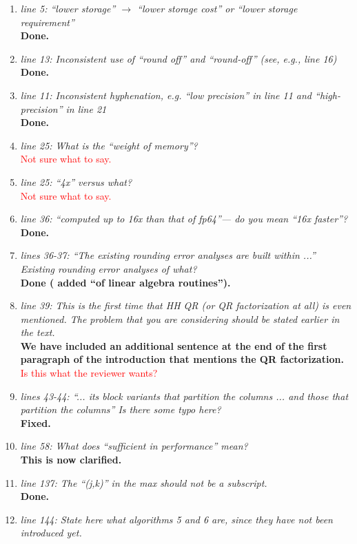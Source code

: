 \documentclass[final,onefignum,onetabnum]{siamart190516}
\newcommand{\red}[1]{\textcolor{red}{#1}}
\begin{document}
\begin{enumerate}
    \item {\it line 5: ``lower storage'' $\rightarrow$ ``lower storage cost'' or ``lower storage requirement'' }\\
    {\bf Done.}
    \item {\it line 13: Inconsistent use of ``round off'' and ``round-off'' (see, e.g., line 16) }\\
    {\bf Done.}
    \item {\it line 11: Inconsistent hyphenation, e.g. ``low precision'' in line 11 and ``high-precision'' in line 21 }\\
    {\bf Done.}
    \item {\it line 25: What is the ``weight of memory''? }\\
    \red{Not sure what to say.}
    \item {\it line 25: ``4x'' versus what? }\\
    \red{Not sure what to say.}
    \item {\it line 36: ``computed up to 16x than that of fp64''--- do you mean ``16x faster''? }\\
    {\bf Done.}
    \item {\it lines 36-37: ``The existing rounding error analyses are built within ...'' Existing rounding error analyses of what? }\\
    {\bf Done ( added ``of linear algebra routines'').}
    \item {\it line 39: This is the first time that HH QR (or QR factorization at all) is even mentioned. The problem that you are considering should be stated earlier in the text. }\\
    {\bf We have included an additional sentence at the end of the first paragraph of the introduction that mentions the QR factorization.}
    \red{Is this what the reviewer wants?}
    \item {\it lines 43-44: ``... its block variants that partition the columns ... and those that partition the columns'' Is there some typo here? }\\
    {\bf Fixed.}
    \item {\it line 58: What does ``sufficient in performance'' mean? }\\
    {\bf This is now clarified.}
    \item {\it line 137: The ``(j,k)'' in the max should not be a subscript. }\\
    {\bf Done.}
    \item {\it line 144: State here what algorithms 5 and 6 are, since they have not been introduced yet. }\\

\end{enumerate}
\end{document}
